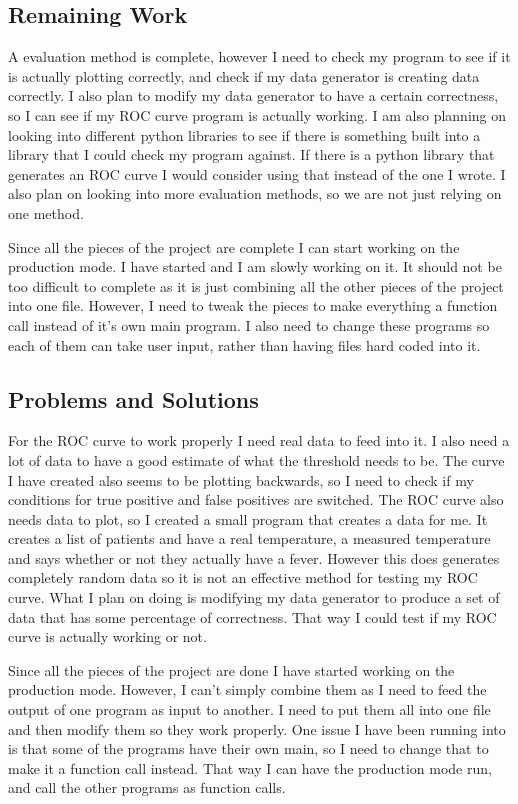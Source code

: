 \documentclass[onecolumn, draftclsnofoot,10pt, compsoc]{IEEEtran}
\begin{document}
\subsection{Remaining Work}
A evaluation method is complete, however I need to check my program to see if it is actually plotting correctly, and check if my data generator is creating data correctly. I also plan to modify my data generator to have a certain correctness, so I can see if my ROC curve program is actually working. I am also planning on looking into different python libraries to see if there is something built into a library that I could check my program against. If there is a python library that generates an ROC curve I would consider using that instead of the one I wrote. I also plan on looking into more evaluation methods, so we are not just relying on one method.

Since all the pieces of the project are complete I can start working on the production mode. I have started and I am slowly working on it. It should not be too difficult to complete as it is just combining all the other pieces of the project into one file. However, I need to tweak the pieces to make everything a function call instead of it’s own main program. I also need to change these programs so each of them can take user input, rather than having files hard coded into it.

\subsection{Problems and Solutions}

For the ROC curve to work properly I need real data to feed into it. I also need a lot of data to have a good estimate of what the threshold needs to be. The curve I have created also seems to be plotting backwards, so I need to check if my conditions for true positive and false positives are switched. The ROC curve also needs data to plot, so I created a small program that creates a data for me. It creates a list of patients and have a real temperature, a measured temperature and says whether or not they actually have a fever. However this does generates completely random data so it is not an effective method for testing my ROC curve. What I plan on doing is modifying my data generator to produce a set of data that has some percentage of correctness. That way I could test if my ROC curve is actually working or not.

Since all the pieces of the project are done I have started working on the production mode. However, I can’t simply combine them as I need to feed the output of one program as input to another. I need to put them all into one file and then modify them so they work properly. One issue I have been running into is that some of the programs have their own main, so I need to change that to make it a function call instead. That way I can have the production mode run, and call the other programs as function calls.
\end{document}
